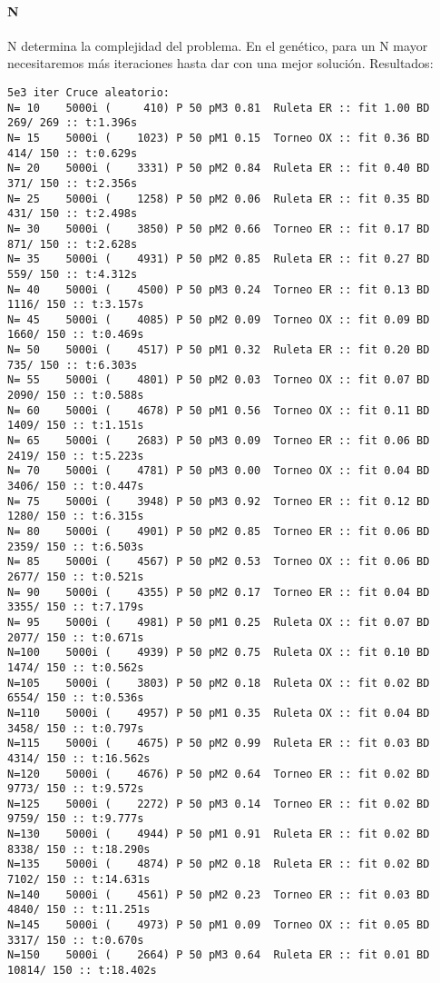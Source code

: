 \documentclass[10pt]{article}
\begin{document}
\paragraph{N}N determina la complejidad del problema.  En el genético, para un N mayor necesitaremos más iteraciones hasta dar con una mejor solución.
Resultados:
\begin{verbatim}
5e3 iter Cruce aleatorio:
N= 10    5000i (     410) P 50 pM3 0.81  Ruleta ER :: fit 1.00 BD  269/ 269 :: t:1.396s
N= 15    5000i (    1023) P 50 pM1 0.15  Torneo OX :: fit 0.36 BD  414/ 150 :: t:0.629s
N= 20    5000i (    3331) P 50 pM2 0.84  Ruleta ER :: fit 0.40 BD  371/ 150 :: t:2.356s
N= 25    5000i (    1258) P 50 pM2 0.06  Ruleta ER :: fit 0.35 BD  431/ 150 :: t:2.498s
N= 30    5000i (    3850) P 50 pM2 0.66  Torneo ER :: fit 0.17 BD  871/ 150 :: t:2.628s
N= 35    5000i (    4931) P 50 pM2 0.85  Ruleta ER :: fit 0.27 BD  559/ 150 :: t:4.312s
N= 40    5000i (    4500) P 50 pM3 0.24  Torneo ER :: fit 0.13 BD 1116/ 150 :: t:3.157s
N= 45    5000i (    4085) P 50 pM2 0.09  Torneo OX :: fit 0.09 BD 1660/ 150 :: t:0.469s
N= 50    5000i (    4517) P 50 pM1 0.32  Ruleta ER :: fit 0.20 BD  735/ 150 :: t:6.303s
N= 55    5000i (    4801) P 50 pM2 0.03  Torneo OX :: fit 0.07 BD 2090/ 150 :: t:0.588s
N= 60    5000i (    4678) P 50 pM1 0.56  Torneo OX :: fit 0.11 BD 1409/ 150 :: t:1.151s
N= 65    5000i (    2683) P 50 pM3 0.09  Torneo ER :: fit 0.06 BD 2419/ 150 :: t:5.223s
N= 70    5000i (    4781) P 50 pM3 0.00  Torneo OX :: fit 0.04 BD 3406/ 150 :: t:0.447s
N= 75    5000i (    3948) P 50 pM3 0.92  Torneo ER :: fit 0.12 BD 1280/ 150 :: t:6.315s
N= 80    5000i (    4901) P 50 pM2 0.85  Torneo ER :: fit 0.06 BD 2359/ 150 :: t:6.503s
N= 85    5000i (    4567) P 50 pM2 0.53  Torneo OX :: fit 0.06 BD 2677/ 150 :: t:0.521s
N= 90    5000i (    4355) P 50 pM2 0.17  Torneo ER :: fit 0.04 BD 3355/ 150 :: t:7.179s
N= 95    5000i (    4981) P 50 pM1 0.25  Ruleta OX :: fit 0.07 BD 2077/ 150 :: t:0.671s
N=100    5000i (    4939) P 50 pM2 0.75  Ruleta OX :: fit 0.10 BD 1474/ 150 :: t:0.562s
N=105    5000i (    3803) P 50 pM2 0.18  Ruleta OX :: fit 0.02 BD 6554/ 150 :: t:0.536s
N=110    5000i (    4957) P 50 pM1 0.35  Ruleta OX :: fit 0.04 BD 3458/ 150 :: t:0.797s
N=115    5000i (    4675) P 50 pM2 0.99  Ruleta ER :: fit 0.03 BD 4314/ 150 :: t:16.562s
N=120    5000i (    4676) P 50 pM2 0.64  Torneo ER :: fit 0.02 BD 9773/ 150 :: t:9.572s
N=125    5000i (    2272) P 50 pM3 0.14  Torneo ER :: fit 0.02 BD 9759/ 150 :: t:9.777s
N=130    5000i (    4944) P 50 pM1 0.91  Ruleta ER :: fit 0.02 BD 8338/ 150 :: t:18.290s
N=135    5000i (    4874) P 50 pM2 0.18  Ruleta ER :: fit 0.02 BD 7102/ 150 :: t:14.631s
N=140    5000i (    4561) P 50 pM2 0.23  Torneo ER :: fit 0.03 BD 4840/ 150 :: t:11.251s
N=145    5000i (    4973) P 50 pM1 0.09  Torneo OX :: fit 0.05 BD 3317/ 150 :: t:0.670s
N=150    5000i (    2664) P 50 pM3 0.64  Ruleta ER :: fit 0.01 BD 10814/ 150 :: t:18.402s


\end{verbatim}
\end{document}
